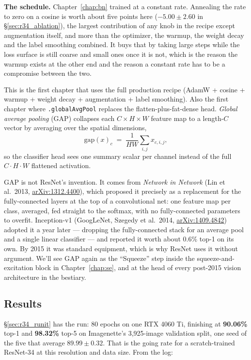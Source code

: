 \medskip\noindent \textbf{The schedule.} Chapter~\ref{chap:bn} trained at a
constant rate. Annealing the rate to zero on a cosine is worth about five
points here ($-5.00 \pm 2.60$ in \S\ref{sec:r34_ablation}), the largest
contribution of any knob in the recipe except augmentation itself, and more
than the optimizer, the warmup, the weight decay and the label smoothing
combined. It buys that by taking large
steps while the loss surface is still coarse and small ones once it is not,
which is the reason the warmup exists at the other end and the reason a constant
rate has to be a compromise between the two.

\medskip\noindent This is the first chapter that uses the full production
recipe (AdamW + cosine + warmup + weight decay + augmentation + label
smoothing). Also the first chapter where
\texttt{.globalAvgPool} replaces the flatten-plus-fat-dense head.
\emph{Global average pooling} (GAP) collapses each
\(C \times H \times W\) feature map to a length-\(C\) vector by
averaging over the spatial dimensions,
\[
  \mathrm{gap}(x)_c \;=\; \frac{1}{HW} \sum_{i, j} x_{c, i, j},
\]
so the classifier head sees one summary scalar per channel instead
of the full \(C \cdot H \cdot W\) flattened activation.

GAP is not ResNet's invention. It comes from \emph{Network in Network}
(Lin et al.\ 2013,
\href{https://arxiv.org/abs/1312.4400}{arXiv:1312.4400}), which proposed
it precisely as a replacement for the fully-connected layers at the top of
a convolutional net: one feature map per class, averaged, fed straight to
the softmax, with no fully-connected parameters to overfit. Inception-v1
(GoogLeNet, Szegedy et al.\ 2014,
\href{https://arxiv.org/abs/1409.4842}{arXiv:1409.4842}) adopted it a year
later --- dropping the fully-connected stack for an average pool and a
single linear classifier --- and reported it worth about $0.6\%$ top-1 on
its own. By 2015 it was standard equipment, which is why ResNet uses it
without argument. We'll see GAP
again as the ``Squeeze'' step inside the squeeze-and-excitation
block in Chapter~\ref{chap:se}, and at the head of every
post-2015 vision architecture in the bestiary.

\subsection*{Results}

\S\ref{sec:r34_runit} has the run: 80 epochs on one RTX 4060 Ti, finishing at
\textbf{90.06\%} top-1 and \textbf{98.32\%} top-5 on Imagenette's 3,925-image
validation split, one seed of the five that average $89.99 \pm 0.32$. That is
the going rate for a scratch-trained ResNet-34 at this resolution and data
size. From the log:

